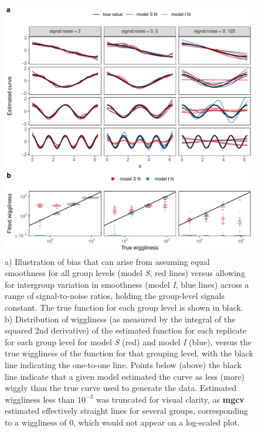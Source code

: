 \documentclass[12pt]{article}
\begin{document}
\begin{figure}
\centering
\includegraphics{../figures/Fig18.pdf}
\caption{\label{fig:Fig18} a) Illustration of bias that can arise from
assuming equal smoothness for all group levels (model \emph{S}, red
lines) versus allowing for intergroup variation in smoothness (model
\emph{I}, blue lines) across a range of signal-to-noise ratios, holding
the group-level signals constant. The true function for each group level
is shown in black. b) Distribution of wiggliness (as measured by the
integral of the squared 2nd derivative) of the estimated function for
each replicate for each group level for model \emph{S} (red) and model
\emph{I} (blue), versus the true wiggliness of the function for that
grouping level, with the black line indicating the one-to-one line.
Points below (above) the black line indicate that a given model
estimated the curve as less (more) wiggly than the true curve used to
generate the data. Estimated wiggliness less than \(10^{-3}\) was
truncated for visual clarity, as \textbf{mgcv} estimated effectively
straight lines for several groups, corresponding to a wiggliness of 0,
which would not appear on a log-scaled plot.}
\end{figure}
\end{document}
